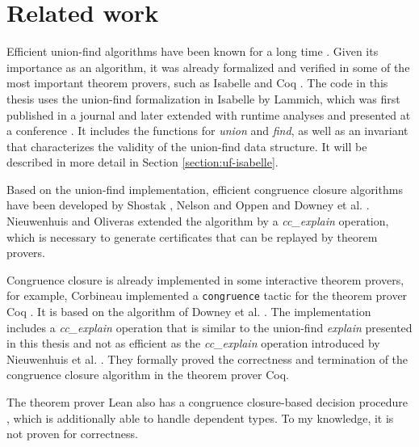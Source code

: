 \section{Related work}

Efficient union-find algorithms have been known for a long time \cite{unionfind-og, Tarjan}. Given its importance as an algorithm, it was already formalized and verified in some of the most important theorem provers, such as Isabelle and Coq \cite{unionfind-persistent}. The code in this thesis uses the union-find formalization in Isabelle by Lammich, which was first published in a journal \cite{unionfind-isabelle} and later extended with runtime analyses and presented at a conference \cite{unionfind-isabelle-conference}. It includes the functions for \emph{union} and \emph{find}, as well as an invariant that characterizes the validity of the union-find data structure. It will be described in more detail in Section \ref{section:uf-isabelle}.

Based on the union-find implementation, efficient congruence closure algorithms have been developed by Shostak \cite{congruenceclosure-og2}, Nelson and Oppen \cite{congruenceclosure-og} and Downey et al. \cite{congruenceclosure-og3}.
Nieuwenhuis and Oliveras \cite{Nieuwenhuis} extended the algorithm by a \emph{cc\_explain} operation, which is necessary to generate certificates that can be replayed by theorem provers.

Congruence closure is already implemented in some interactive theorem provers, for example,  Corbineau implemented a \lstinline|congruence| tactic for the theorem prover Coq \cite{congruenceclosure-coq, congruence-coq}. It is based on the algorithm of Downey et al. \cite{congruenceclosure-og3}. The implementation includes a \emph{cc\_explain} operation that is similar to the union-find \emph{explain} presented in this thesis and not as efficient as the \emph{cc\_explain} operation introduced by Nieuwenhuis et al. \cite{Nieuwenhuis}. They formally proved the correctness and termination of the congruence closure algorithm in the theorem prover Coq.

The theorem prover Lean also has a congruence closure-based decision procedure \cite{congruenceclosure-lean}, which is additionally able to handle dependent types. To my knowledge, it is not proven for correctness.

